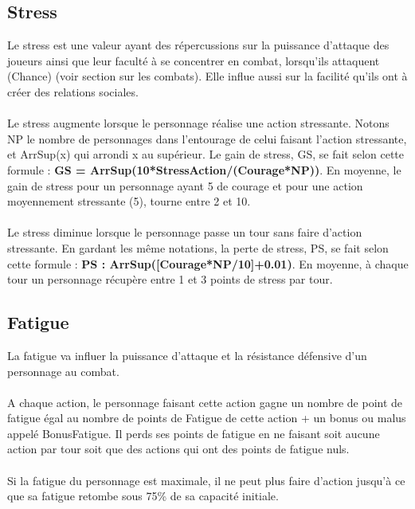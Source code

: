 \subsection{Stress}
Le stress est une valeur ayant des répercussions sur la puissance d'attaque des joueurs ainsi que leur faculté à se concentrer en combat, lorsqu'ils attaquent (Chance) (voir section sur les combats). Elle influe aussi sur la facilité qu'ils ont à créer des relations sociales.
\\\\
Le stress augmente lorsque le personnage réalise une action stressante. Notons NP le nombre de personnages dans l'entourage de celui faisant l'action stressante, et ArrSup(x) qui arrondi x au supérieur. Le gain de stress, GS, se fait selon cette formule : \textbf{GS = ArrSup(10*StressAction/(Courage*NP))}. En moyenne, le gain de stress pour un personnage ayant 5 de courage et pour une action moyennement stressante (5), tourne entre 2 et 10.
\\\\
Le stress diminue lorsque le personnage passe un tour sans faire d'action stressante. En gardant les même notations, la perte de stress, PS, se fait selon cette formule : \textbf{PS : ArrSup([Courage*NP/10]+0.01)}. En moyenne, à chaque tour un personnage récupère entre 1 et 3 points de stress par tour.
\subsection{Fatigue}
La fatigue va influer la puissance d'attaque et la résistance défensive d'un personnage au combat.
\\\\
A chaque action, le personnage faisant cette action gagne un nombre de point de fatigue égal au nombre de points de Fatigue de cette action + un bonus ou malus appelé BonusFatigue. Il perds ses points de fatigue en ne faisant soit aucune action par tour soit que des actions qui ont des points de fatigue nuls.
\\\\
Si la fatigue du personnage est maximale, il ne peut plus faire d'action jusqu'à ce que sa fatigue retombe sous 75\% de sa capacité initiale.
